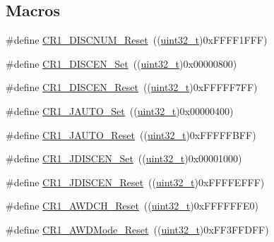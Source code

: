 \subsection*{Macros}
\begin{DoxyCompactItemize}
\item 
\#define \hyperlink{group___a_d_c___private___defines_ga88cecf0c336d950115d7a52d599de816}{C\+R1\+\_\+\+D\+I\+S\+C\+N\+U\+M\+\_\+\+Reset}~((\hyperlink{_p_e___types_8h_a33594304e786b158f3fb30289278f5af}{uint32\+\_\+t})0x\+F\+F\+F\+F1\+F\+F\+F)
\item 
\#define \hyperlink{group___a_d_c___private___defines_ga95f4f653adde3407c116919c2b7d9c74}{C\+R1\+\_\+\+D\+I\+S\+C\+E\+N\+\_\+\+Set}~((\hyperlink{_p_e___types_8h_a33594304e786b158f3fb30289278f5af}{uint32\+\_\+t})0x00000800)
\item 
\#define \hyperlink{group___a_d_c___private___defines_ga959f617e77853bff85ca5e8d6fba6611}{C\+R1\+\_\+\+D\+I\+S\+C\+E\+N\+\_\+\+Reset}~((\hyperlink{_p_e___types_8h_a33594304e786b158f3fb30289278f5af}{uint32\+\_\+t})0x\+F\+F\+F\+F\+F7\+F\+F)
\item 
\#define \hyperlink{group___a_d_c___private___defines_gaa8478f12e212738e249a7fafb69d4dd4}{C\+R1\+\_\+\+J\+A\+U\+T\+O\+\_\+\+Set}~((\hyperlink{_p_e___types_8h_a33594304e786b158f3fb30289278f5af}{uint32\+\_\+t})0x00000400)
\item 
\#define \hyperlink{group___a_d_c___private___defines_gab6c4a9f0a661bf7c5add35ea3a90b756}{C\+R1\+\_\+\+J\+A\+U\+T\+O\+\_\+\+Reset}~((\hyperlink{_p_e___types_8h_a33594304e786b158f3fb30289278f5af}{uint32\+\_\+t})0x\+F\+F\+F\+F\+F\+B\+F\+F)
\item 
\#define \hyperlink{group___a_d_c___private___defines_gafef4d16c890bf5e6eb381ad01c829309}{C\+R1\+\_\+\+J\+D\+I\+S\+C\+E\+N\+\_\+\+Set}~((\hyperlink{_p_e___types_8h_a33594304e786b158f3fb30289278f5af}{uint32\+\_\+t})0x00001000)
\item 
\#define \hyperlink{group___a_d_c___private___defines_gab6ffba92495342bd5f0a8b1fa216526b}{C\+R1\+\_\+\+J\+D\+I\+S\+C\+E\+N\+\_\+\+Reset}~((\hyperlink{_p_e___types_8h_a33594304e786b158f3fb30289278f5af}{uint32\+\_\+t})0x\+F\+F\+F\+F\+E\+F\+F\+F)
\item 
\#define \hyperlink{group___a_d_c___private___defines_gabe7e68383d281e58707a1cd749a3374e}{C\+R1\+\_\+\+A\+W\+D\+C\+H\+\_\+\+Reset}~((\hyperlink{_p_e___types_8h_a33594304e786b158f3fb30289278f5af}{uint32\+\_\+t})0x\+F\+F\+F\+F\+F\+F\+E0)
\item 
\#define \hyperlink{group___a_d_c___private___defines_gae53703f0c718ecc5b3e1a69c60af3697}{C\+R1\+\_\+\+A\+W\+D\+Mode\+\_\+\+Reset}~((\hyperlink{_p_e___types_8h_a33594304e786b158f3fb30289278f5af}{uint32\+\_\+t})0x\+F\+F3\+F\+F\+D\+F\+F)

\end{DoxyCompactItemize}

